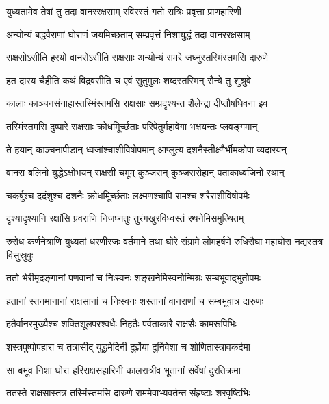 
\twolineshloka
{युध्यतामेव तेषां तु तदा वानररक्षसाम्}
{रविरस्तं गतो रात्रिः प्रवृत्ता प्राणहारिणी} %

\twolineshloka
{अन्योन्यं बद्धवैराणां घोराणं जयमिच्छताम्}
{सम्प्रवृत्तं निशायुद्धं तदा वानररक्षसाम्} %

\twolineshloka
{राक्षसोऽसीति हरयो वानरोऽसीति राक्षसाः}
{अन्योन्यं समरे जघ्नुस्तस्मिंस्तमसि दारुणे} %

\twolineshloka
{हत दारय चैहीति कथं विद्रवसीति च}
{एवं सुतुमुलः शब्दस्तस्मिन् सैन्ये तु शुश्रुवे} %

\twolineshloka
{कालाः काञ्चनसंनाहास्तस्मिंस्तमसि राक्षसाः}
{सम्प्रदृश्यन्त शैलेन्द्रा दीप्तौषधिवना इव} %

\twolineshloka
{तस्मिंस्तमसि दुष्पारे राक्षसाः क्रोधमूिर्च्छताः}
{परिपेतुर्महावेगा भक्षयन्तः प्लवङ्गमान्} %

\twolineshloka
{ते हयान् काञ्चनापीडान् ध्वजांश्चाशीविषोपमान्}
{आप्लुत्य दशनैस्तीक्ष्णैर्भीमकोपा व्यदारयन्} %

\twolineshloka
{वानरा बलिनो युद्धेऽक्षोभयन् राक्षसीं चमूम्}
{कुञ्जरान् कुञ्जरारोहान् पताकाध्वजिनो रथान्} %

\twolineshloka
{चकर्षुश्च ददंशुश्च दशनैः क्रोधमूिर्च्छताः}
{लक्ष्मणश्चापि रामश्च शरैराशीविषोपमैः} %

\twolineshloka
{दृश्यादृश्यानि रक्षांसि प्रवराणि निजघ्नतुः}
{तुरंगखुरविध्वस्तं रथनेमिसमुत्थितम्} %

\threelineshloka
{रुरोध कर्णनेत्राणि युध्यतां धरणीरजः}
{वर्तमाने तथा घोरे संग्रामे लोमहर्षणे}
{रुधिरौघा महाघोरा नद्यस्तत्र विसुस्रुवुः} %

\twolineshloka
{ततो भेरीमृदङ्गानां पणवानां च निःस्वनः}
{शङ्खनेमिस्वनोन्मिश्रः सम्बभूवाद्भुतोपमः} %

\twolineshloka
{हतानां स्तनमानानां राक्षसानां च निःस्वनः}
{शस्तानां वानराणां च सम्बभूवात्र दारुणः} %

\twolineshloka
{हतैर्वानरमुख्यैश्च शक्तिशूलपरश्वधैः}
{निहतैः पर्वताकारै राक्षसैः कामरूपिभिः} %

\twolineshloka
{शस्त्रपुष्पोपहारा च तत्रासीद् युद्धमेदिनी}
{दुर्ज्ञेया दुर्निवेशा च शोणितास्त्रावकर्दमा} %

\twolineshloka
{सा बभूव निशा घोरा हरिराक्षसहारिणी}
{कालरात्रीव भूतानां सर्वेषां दुरतिक्रमा} %

\twolineshloka
{ततस्ते राक्षसास्तत्र तस्मिंस्तमसि दारुणे}
{राममेवाभ्यवर्तन्त संहृष्टाः शरवृष्टिभिः} %

